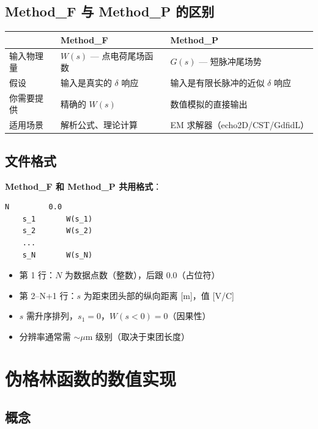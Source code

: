 \documentclass[a4paper,11pt]{article}
\begin{document}
\subsection{Method\_F 与 Method\_P 的区别}

\begin{center}
\begin{tabular}{p{3cm} p{5cm} p{5cm}}
\toprule
& \textbf{Method\_F} & \textbf{Method\_P} \\
\midrule
输入物理量 & $W(s)$ — 点电荷尾场函数 & $G(s)$ — 短脉冲尾场势 \\
假设 & 输入是真实的 $\delta$ 响应 & 输入是有限长脉冲的近似 $\delta$ 响应 \\
你需要提供 & 精确的 $W(s)$ & 数值模拟的直接输出 \\
适用场景 & 解析公式、理论计算 & EM 求解器（echo2D/CST/GdfidL） \\
\bottomrule
\end{tabular}
\end{center}

\subsection{文件格式}

\textbf{Method\_F 和 Method\_P 共用格式}：

\begin{lstlisting}[gobble=4]
    N         0.0
    s_1       W(s_1)
    s_2       W(s_2)
    ...
    s_N       W(s_N)
\end{lstlisting}

\begin{itemize}
  \item 第 1 行：$N$ 为数据点数（整数），后跟 0.0（占位符）
  \item 第 2--N+1 行：$s$ 为距束团头部的纵向距离 [m]，值 [V/C]
  \item $s$ 需升序排列，$s_1=0$，$W(s<0) = 0$（因果性）
  \item 分辨率通常需 $\sim \mu$m 级别（取决于束团长度）
\end{itemize}

\section{伪格林函数的数值实现}

\subsection{概念}
\end{document}
